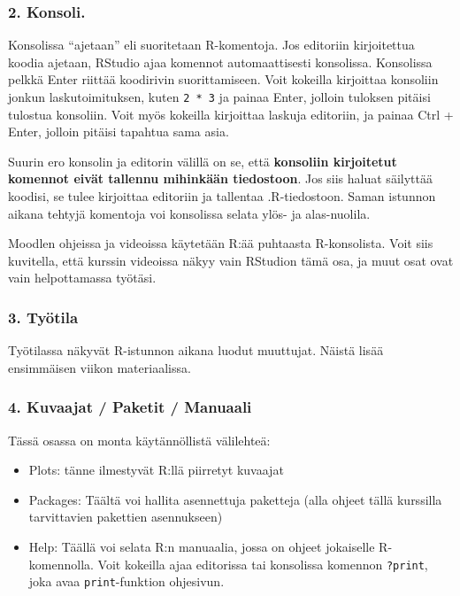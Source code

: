 \documentclass[
]{book}
\providecommand{\tightlist}{%
  \setlength{\itemsep}{0pt}\setlength{\parskip}{0pt}}
\begin{document}
\hypertarget{konsoli.}{%
\subsubsection*{2. Konsoli.}\label{konsoli.}}

Konsolissa ``ajetaan'' eli suoritetaan R-komentoja. Jos editoriin kirjoitettua koodia ajetaan, RStudio ajaa komennot automaattisesti konsolissa. Konsolissa pelkkä Enter riittää koodirivin suorittamiseen. Voit kokeilla kirjoittaa konsoliin jonkun laskutoimituksen, kuten \texttt{2\ *\ 3} ja painaa Enter, jolloin tuloksen pitäisi tulostua konsoliin. Voit myös kokeilla kirjoittaa laskuja editoriin, ja painaa Ctrl + Enter, jolloin pitäisi tapahtua sama asia.

Suurin ero konsolin ja editorin välillä on se, että \textbf{konsoliin kirjoitetut komennot eivät tallennu mihinkään tiedostoon}. Jos siis haluat säilyttää koodisi, se tulee kirjoittaa editoriin ja tallentaa .R-tiedostoon. Saman istunnon aikana tehtyjä komentoja voi konsolissa selata ylös- ja alas-nuolila.

Moodlen ohjeissa ja videoissa käytetään R:ää puhtaasta R-konsolista. Voit siis kuvitella, että kurssin videoissa näkyy vain RStudion tämä osa, ja muut osat ovat vain helpottamassa työtäsi.

\hypertarget{tyuxf6tila}{%
\subsubsection*{3. Työtila}\label{tyuxf6tila}}

Työtilassa näkyvät R-istunnon aikana luodut muuttujat. Näistä lisää ensimmäisen viikon materiaalissa.

\hypertarget{kuvaajat-paketit-manuaali}{%
\subsubsection*{4. Kuvaajat / Paketit / Manuaali}\label{kuvaajat-paketit-manuaali}}

Tässä osassa on monta käytännöllistä välilehteä:

\begin{itemize}
\tightlist
\item
  Plots: tänne ilmestyvät R:llä piirretyt kuvaajat
\item
  Packages: Täältä voi hallita asennettuja paketteja (alla ohjeet tällä kurssilla tarvittavien pakettien asennukseen)
\item
  Help: Täällä voi selata R:n manuaalia, jossa on ohjeet jokaiselle R-komennolla. Voit kokeilla ajaa editorissa tai konsolissa komennon \texttt{?print}, joka avaa \texttt{print}-funktion ohjesivun.
\end{itemize}
\end{document}
